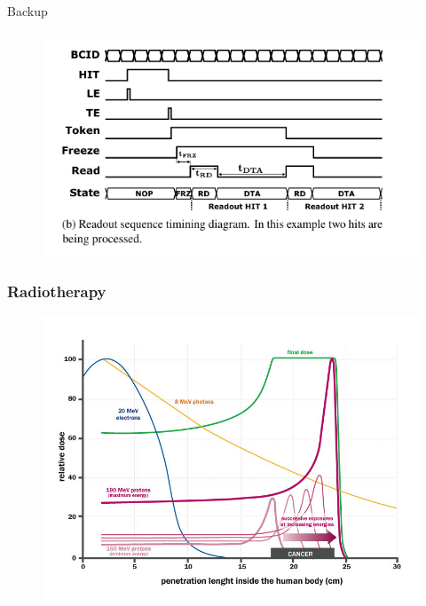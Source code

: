     \begin{frame}
        Backup        
    \end{frame} 

    

    \begin{frame}
        \frametitle{}
        \begin{figure}[h!]
            \centering
            \includegraphics[width=.8\linewidth]{figures/Monopix1/readout_timing.png}
        \end{figure}
    \end{frame} 

    \begin{frame}
        \frametitle{Radiotherapy}
        \begin{figure}[h!]
            \centering
            \includegraphics[width=.8\linewidth]{figures/pixel_detectors_usage/Bragg-Peak.png}
        \end{figure}
    \end{frame} 


